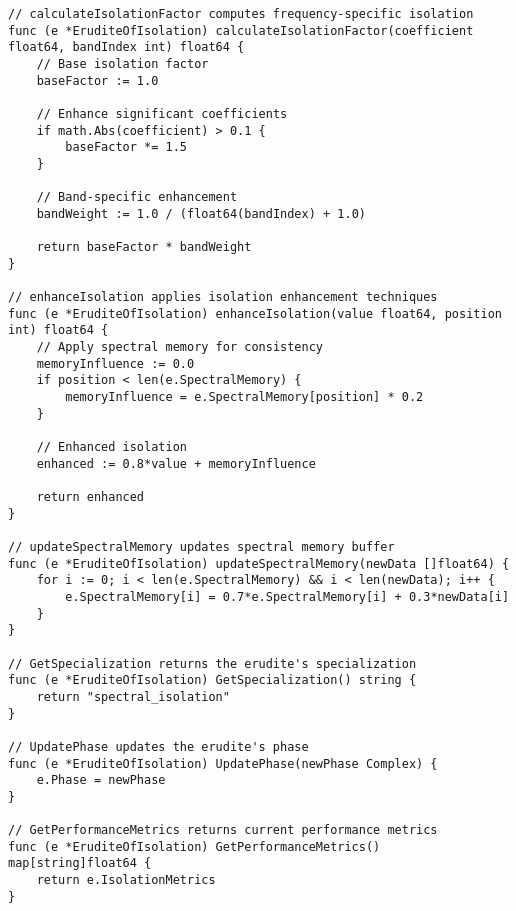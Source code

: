 \begin{tcolorbox}[colback=CodeBackground, colframe=DarkGray, title=Erudite of Isolation Implementation, fonttitle=\bfseries]
\begin{verbatim}
// calculateIsolationFactor computes frequency-specific isolation
func (e *EruditeOfIsolation) calculateIsolationFactor(coefficient float64, bandIndex int) float64 {
    // Base isolation factor
    baseFactor := 1.0
    
    // Enhance significant coefficients
    if math.Abs(coefficient) > 0.1 {
        baseFactor *= 1.5
    }
    
    // Band-specific enhancement
    bandWeight := 1.0 / (float64(bandIndex) + 1.0)
    
    return baseFactor * bandWeight
}

// enhanceIsolation applies isolation enhancement techniques
func (e *EruditeOfIsolation) enhanceIsolation(value float64, position int) float64 {
    // Apply spectral memory for consistency
    memoryInfluence := 0.0
    if position < len(e.SpectralMemory) {
        memoryInfluence = e.SpectralMemory[position] * 0.2
    }
    
    // Enhanced isolation
    enhanced := 0.8*value + memoryInfluence
    
    return enhanced
}

// updateSpectralMemory updates spectral memory buffer
func (e *EruditeOfIsolation) updateSpectralMemory(newData []float64) {
    for i := 0; i < len(e.SpectralMemory) && i < len(newData); i++ {
        e.SpectralMemory[i] = 0.7*e.SpectralMemory[i] + 0.3*newData[i]
    }
}

// GetSpecialization returns the erudite's specialization
func (e *EruditeOfIsolation) GetSpecialization() string {
    return "spectral_isolation"
}

// UpdatePhase updates the erudite's phase
func (e *EruditeOfIsolation) UpdatePhase(newPhase Complex) {
    e.Phase = newPhase
}

// GetPerformanceMetrics returns current performance metrics
func (e *EruditeOfIsolation) GetPerformanceMetrics() map[string]float64 {
    return e.IsolationMetrics
}
\end{verbatim}
\end{tcolorbox}

